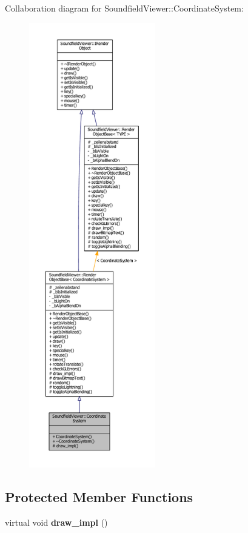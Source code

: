 Collaboration diagram for Soundfield\-Viewer\-:\-:Coordinate\-System\-:\nopagebreak
\begin{figure}[H]
\begin{center}
\leavevmode
\includegraphics[height=550pt]{d9/d64/classSoundfieldViewer_1_1CoordinateSystem__coll__graph}
\end{center}
\end{figure}
\subsection*{Protected Member Functions}
\begin{DoxyCompactItemize}
\item 
virtual void {\bfseries draw\-\_\-impl} ()\label{classSoundfieldViewer_1_1CoordinateSystem_ae34b16249cb766ec5687eccc19e364a7}

\end{DoxyCompactItemize}
